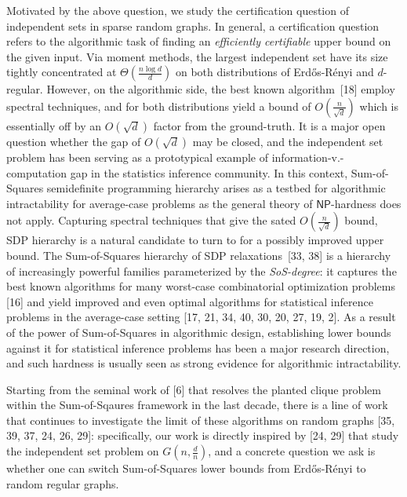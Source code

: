 \documentclass[10pt,a4paper]{article}
\begin{document}
Motivated by the above question, we study the certification question of independent sets in sparse random graphs. In general, a certification question refers to the algorithmic task of finding an
\emph{efficiently certifiable} upper bound on the given input. Via moment methods, the largest independent set have its size tightly concentrated at $\Theta(\frac{n\log d}{d})$ on both distributions of Erdős-Rényi and $d$-regular. However, on the algorithmic side, the best known algorithm [18] employ spectral techniques, and for both distributions yield a bound of $O(\frac{n}{\sqrt{d}})$ which is essentially off by an $O(\sqrt{d})$ factor from the ground-truth. It is a major open question whether the gap of $O(\sqrt{d})$ may be closed, and the independent set problem has been serving as a prototypical example of information-v.-computation gap in the statistics inference community. In this context, Sum-of-Squares semidefinite programming hierarchy arises as a testbed for algorithmic intractability for average-case problems as the general theory of $\mathsf{NP}$-hardness does not apply. Capturing spectral techniques that give the sated $O(\frac{n}{\sqrt{d}})$ bound, SDP hierarchy is a natural candidate to turn to for a possibly improved upper bound. The Sum-of-Squares hierarchy of SDP relaxations [33, 38] is a hierarchy of increasingly powerful families parameterized by the \emph{SoS-degree}: it captures the best known algorithms for many worst-case combinatorial optimization problems [16] and yield improved and even optimal algorithms for statistical inference problems in the average-case setting [17, 21, 34, 40, 30, 20, 27, 19, 2]. As a result of the power of Sum-of-Squares in algorithmic design, establishing lower bounds against it for statistical inference problems has been a major research direction, and such hardness is usually seen as strong evidence for algorithmic intractability.\par




Starting from the seminal work of [6] that resolves the planted clique problem within the Sum-of-Sqaures framework in the last decade, there is a line of work that continues to investigate the limit of these algorithms on random graphs [35, 39, 37, 24, 26, 29]: specifically, our work is directly inspired by [24, 29] that study the independent set problem on $G(n,\frac{d}{n})$, and a concrete question we ask is whether one can switch Sum-of-Squares lower bounds from Erdős-Rényi to random regular graphs.\par
\end{document}
